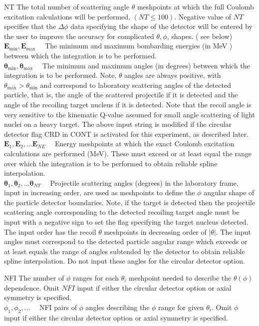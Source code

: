 \documentclass[10pt]{article}
\begin{document}
NT The total number of scattering angle $\theta$ meshpoints at which the full Coulomb excitation calculations will be performed, $(N T \leq 100)$. Negative value of $N T$ specifies that the $\Delta \phi$ data specifying the shape of the detector will be entered by the user to improve the accuracy for complicated $\theta, \phi$, shapes. ( see below)\\
$\mathbf{E}_{\min }, \mathbf{E}_{\max } \quad$ The minimum and maximum bombarding energies (in MeV ) between which the integration is to be performed.\\
$\boldsymbol{\theta}_{\min }, \boldsymbol{\theta}_{\max } \quad$ The minimum and maximum angles (in degrees) between which the integration is to be performed. Note, $\theta$ angles are always positive, with $\theta_{\max }>\theta_{\min }$ and correspond to laboratory scattering angles of the detected particle, that is, the angle of the scattered projectile if it is detected and the angle of the recoiling target nucleus if it is detected. Note that the recoil angle is very sensitive to the kinematic Q-value assumed for small angle scattering of light nuclei on a heavy target. The above input string is modified if the circular detector flag CRD in CONT is activated for this experiment, as described later.\\
$\mathbf{E}_{1}, \mathbf{E}_{2}, \ldots \mathbf{E}_{N E} \quad$ Energy meshpoints at which the exact Coulomb excitation calculations are performed (MeV). These must exceed or at least equal the range over which the integration is to be performed to obtain reliable spline interpolation.\\
$\boldsymbol{\theta}_{1}, \boldsymbol{\theta}_{2}, \ldots \boldsymbol{\theta}_{N T} \quad$ Projectile scattering angles (degrees) in the laboratory frame, input in increasing order, are used as meshpoints to define the $\phi$ angular shape of the particle detector boundaries. Note, if the target is detected then the projectile scattering angle corresponding to the detected recoiling target angle must be input with a negative sign to set the flag specifying the target nucleus detected. The input order has the recoil $\theta$ meshpoints in decreasing order of $|\theta|$. The input angles must correspond to the detected particle angular range which exceeds or at least equals the range of angles subtended by the detector to obtain reliable spline interpolation. Do not input these angles for the circular detector option.

NFI The number of $\phi$ ranges for each $\theta_{i}$ meshpoint needed to describe the $\theta(\phi)$ dependence. Omit $N F I$ input if either the circular detector option or axial symmetry is specified.\\
$\phi_{1}, \phi_{2}, \ldots \quad$ NFI pairs of $\phi$ angles describing the $\phi$ range for given $\theta_{i}$. Omit $\phi$ input if either the circular detector option or axial symmetry is specified.
\end{document}
